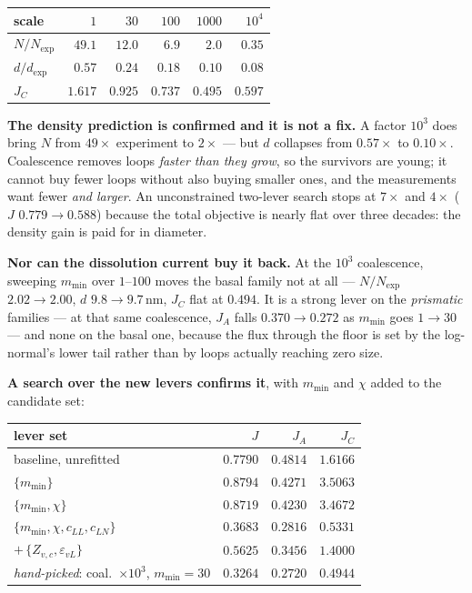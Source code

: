 \documentclass{article}
\begin{document}
\begin{center}\small
\begin{tabular}{@{}lrrrrr@{}}
\toprule
scale & $1$ & $30$ & $100$ & $1000$ & $10^4$\\
\midrule
$N/N_{\exp}$ & $49.1$ & $12.0$ & $6.9$ & $\mathbf{2.0}$ & $0.35$\\
$d/d_{\exp}$ & $0.57$ & $0.24$ & $0.18$ & $\mathbf{0.10}$ & $0.08$\\
$J_C$ & $1.617$ & $0.925$ & $0.737$ & $0.495$ & $0.597$\\
\bottomrule
\end{tabular}
\end{center}

\textbf{The density prediction is confirmed and it is not a fix.} A factor
$10^{3}$ does bring $N$ from $49\times$ experiment to $2\times$ --- but $d$
collapses from $0.57\times$ to $0.10\times$. Coalescence removes loops
\emph{faster than they grow}, so the survivors are young; it cannot buy fewer
loops without also buying smaller ones, and the measurements want fewer
\emph{and larger}. An unconstrained two-lever search stops at $7\times$ and
$4\times$ ($J$ $0.779\to0.588$) because the total objective is nearly flat over
three decades: the density gain is paid for in diameter.

\textbf{Nor can the dissolution current buy it back.} At the $10^{3}$
coalescence, sweeping $m_{\min}$ over $1$--$100$ moves the basal family not at
all --- $N/N_{\exp}$ $2.02\to2.00$, $d$ $9.8\to9.7$\,nm, $J_C$ flat at $0.494$.
It is a strong lever on the \emph{prismatic} families --- at that same
coalescence, $J_A$ falls $0.370\to0.272$ as $m_{\min}$ goes $1\to30$ --- and
none on the basal one, because the flux through the floor is set by the
log-normal's lower tail rather than by loops actually reaching zero size.

\textbf{A search over the new levers confirms it}, with $m_{\min}$ and $\chi$
added to the candidate set:

\begin{center}\small
\begin{tabular}{@{}lrrr@{}}
\toprule
lever set & $J$ & $J_A$ & $J_C$\\
\midrule
baseline, unrefitted & $0.7790$ & $0.4814$ & $1.6166$\\
$\{m_{\min}\}$ & $0.8794$ & $0.4271$ & $3.5063$\\
$\{m_{\min},\chi\}$ & $0.8719$ & $0.4230$ & $3.4672$\\
$\{m_{\min},\chi,c_{LL},c_{LN}\}$ & $\mathbf{0.3683}$ & $0.2816$ & $0.5331$\\
$+\,\{Z_{v,c},\varepsilon_{vL}\}$ & $0.5625$ & $0.3456$ & $1.4000$\\
\emph{hand-picked}: coal.\ $\times10^3$, $m_{\min}=30$ & $\mathbf{0.3264}$ & $0.2720$ & $0.4944$\\
\bottomrule
\end{tabular}
\end{center}
\end{document}
